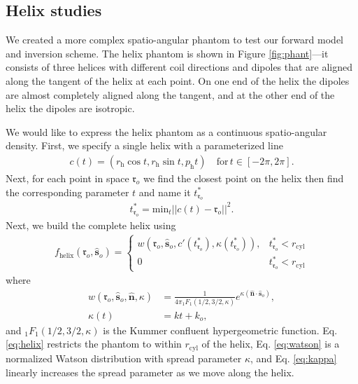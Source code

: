 \documentclass[11pt]{article}
\providecommand{\ro}{\mathbf{\mathfrak{r}}_o}
\providecommand{\so}{\mathbf{\hat{s}}_o}
\providecommand{\mh}[1]{\mathbf{\hat{#1}}}
\begin{document}
\subsection{Helix studies}
We created a more complex spatio-angular phantom to test our forward model and
inversion scheme. The helix phantom is shown in Figure \ref{fig:phant}---it
consists of three helices with different coil directions and dipoles that are
aligned along the tangent of the helix at each point. On one end of the helix
the dipoles are almost completely aligned along the tangent, and at the other
end of the helix the dipoles are isotropic.

We would like to express the helix phantom as a continuous spatio-angular
density. First, we specify a single helix with a parameterized line
\begin{align}
  c(t) = (r_{\text{h}}\cos t, r_{\text{h}}\sin t, p_{\text{h}} t)\quad \text{for}\, t \in [-2\pi, 2\pi].
\end{align}
Next, for each point in space $\ro$ we find the closest point on the helix then
find the corresponding parameter $t$ and name it $t_{\ro}^*$
\begin{align}
t_{\ro}^* = \text{min}_t||c(t) - \ro||^2. 
\end{align}
Next, we build the complete helix using
\begin{align}
  f_{\text{helix}}(\ro, \so) =
  \begin{cases}
    w(\ro, \so, c'(t_{\ro}^*), \kappa(t_{\ro}^*)), & t_{\ro}^* < r_{\text{cyl}} \\
    0 & t_{\ro}^* < r_{\text{cyl}}
  \end{cases}\label{eq:helix}
\end{align}
where
\begin{align}
  w(\ro, \so, \mh{n}, \kappa) &= \frac{1}{4\pi{}_1F_1(1/2,3/2,\kappa)}e^{\kappa(\mh{n}\cdot\so)},\label{eq:watson}\\
  \kappa(t) &= kt + k_o, \label{eq:kappa}
\end{align}
and ${}_1F_1(1/2,3/2,\kappa)$ is the Kummer confluent hypergeometric function.
Eq. \ref{eq:helix} restricts the phantom to within $r_{\text{cyl}}$ of the
helix, Eq. \ref{eq:watson} is a normalized Watson distribution with spread
parameter $\kappa$, and Eq. \ref{eq:kappa} linearly increases the spread parameter as we move along the helix.
\end{document}

